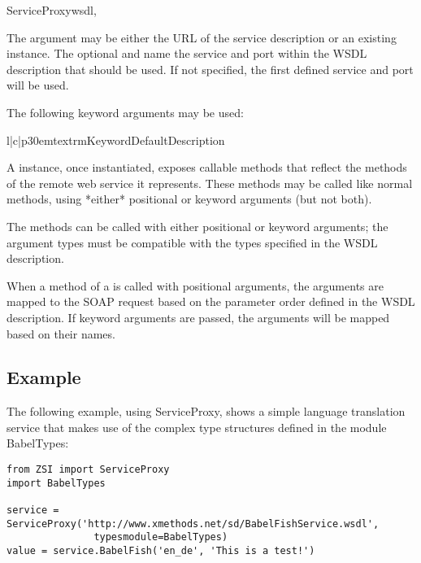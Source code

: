 \begin{classdesc}{ServiceProxy}{wsdl,}

The  argument may be either the URL of the service description 
or an existing  instance. The optional  and 
 name the service and port within the WSDL description that 
should be used. If not specified, the first defined service and port 
will be used.

The following keyword arguments may be used:

\begin{tableiii}{l|c|p{30em}}{textrm}{Keyword}{Default}{Description}
\end{tableiii}

A  instance, once instantiated, exposes callable 
methods that reflect the methods of the remote web service it 
represents. These methods may be called like normal methods, using 
*either* positional or keyword arguments (but not both).

The methods can be called with either positional or keyword arguments;
the argument types must be compatible with the types specified in the
WSDL description.

When a method of a  is called with positional 
arguments, the arguments are mapped to the SOAP request based on 
the parameter order defined in the WSDL description. If keyword 
arguments are passed, the arguments will be mapped based on their 
names.

\end{classdesc}

\subsection{Example}

The following example, using ServiceProxy,  shows a simple language
translation service that makes
use of the complex type structures defined in the module BabelTypes:

\begin{verbatim}
from ZSI import ServiceProxy
import BabelTypes

service = ServiceProxy('http://www.xmethods.net/sd/BabelFishService.wsdl',
		       typesmodule=BabelTypes)
value = service.BabelFish('en_de', 'This is a test!')
\end{verbatim}

